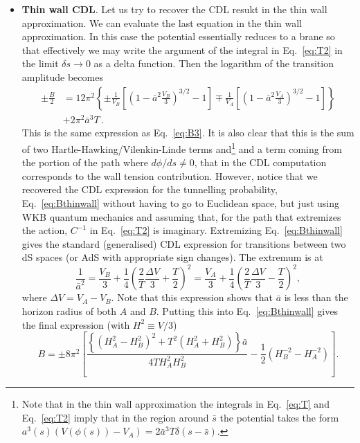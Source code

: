 \documentclass[a4paper,11pt]{article}
\numberwithin{equation}{section}
\begin{document}
\begin{itemize}
\item{\bf Thin wall CDL}. 
Let us try to recover the CDL resukt in the thin wall approximation. We can evaluate the last equation in the thin wall approximation. In this
case the potential essentially reduces to a brane so that effectively
we may write the argument of the integral in Eq.~\eqref{eq:T2} in the limit $\delta s\rightarrow0$
as a delta function. Then the logarithm of the transition amplitude becomes
\begin{align}
\pm \frac{B}{2} & =12\pi^{2}\left\{ \pm\frac{1}{V_{B}}\left[\left(1-\bar{a}^{2}\frac{V_{B}}{3}\right)^{3/2}-1\right]\mp\frac{1}{V_{A}}\left[\left(1-\bar{a}^{2}\frac{V_{A}}{3}\right)^{3/2}-1\right]\right\} \nonumber \\
 & +2\pi^{2}\bar{a}^{3}T \,.\label{eq:Bthinwall}
\end{align}
This is the same expression as Eq.~\eqref{eq:B3}. It is also clear that
this is the sum of two Hartle-Hawking/Vilenkin-Linde terms and\footnote{Note that in the thin wall approximation the integrals in Eq.~\eqref{eq:T} and Eq.~\eqref{eq:T2} imply that in the region around $\bar{s}$ the potential takes the form $a^{3}(s)\left(V(\phi(s))-V_{A}\right)=2\bar{a}^{3}T\delta(s-\bar{s})$.} and a term coming from the portion of the path where $d\phi/ds \neq 0$, that in the CDL computation corresponds to the wall tension contribution. However, notice that we recovered the CDL expression for the tunnelling probability, Eq.~\eqref{eq:Bthinwall} without having to go to Euclidean space, but just using WKB quantum
mechanics and assuming that, for the path that extremizes the action, $C^{-1}$ in Eq.~\eqref{eq:T2} is imaginary. Extremizing Eq.~\eqref{eq:Bthinwall} gives the standard (generalised) CDL expression for transitions between two dS spaces (or AdS with
appropriate sign changes). The extremum is at 
\begin{equation}
\frac{1}{\bar{a}^{2}}=\frac{V_{B}}{3}+\frac{1}{4}\left(\frac{2}{T}\frac{\Delta V}{3}+\frac{T}{2}\right)^{2}=\frac{V_{A}}{3}+\frac{1}{4}\left(\frac{2}{T}\frac{\Delta V}{3}-\frac{T}{2}\right)^{2},\label{eq:abar}
\end{equation}
where $\Delta V=V_{A}-V_{B}$. Note that this expression shows that $\bar{a}$ is less than the horizon radius of both $A$ and $B$.
Putting this into Eq.~\eqref{eq:Bthinwall} gives the final expression (with $H^{2}\equiv V/3$)
\begin{equation}
\boxed{\quad B=\pm8\pi^{2}\left[\frac{\left\{ \left(H_{A}^{2}-H_{B}^{2}\right)^{2}+T^{2}\left(H_{A}^{2}+H_{B}^{2}\right)\right\} \bar{a}}{4TH_{A}^{2}H_{B}^{2}}-\frac{1}{2}\left(H_{B}^{-2}-H_{A}^{-2}\right)\right].\quad }\label{eq:Bthinwallextr}

\end{equation}
\end{itemize}
\end{document}
